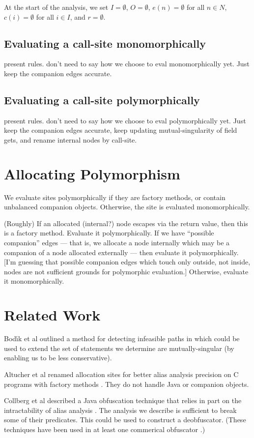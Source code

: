 \documentclass[11pt,notitlepage]{article}
\begin{document}
At the start of the analysis, we set $I=\emptyset$, $O=\emptyset$,
$e(n)=\emptyset$ for all $n\in N$, $c(i)=\emptyset$ for all $i\in I$,
and $r=\emptyset$.

\subsection{Evaluating a call-site monomorphically}

present rules.  don't need to say how we choose to eval
monomorphically yet.  Just keep the companion edges accurate.

\subsection{Evaluating a call-site polymorphically}

present rules.  don't need to say how we choose to eval
polymorphically yet.  Just keep the companion edges accurate,
keep updating mutual-singularity of field gets,
and rename internal nodes by call-site.

\section{Allocating Polymorphism}

We evaluate sites polymorphically if they are factory methods, or
contain unbalanced companion objects.  Otherwise, the site is
evaluated monomorphically.

(Roughly) If an allocated (internal?) node escapes via the return
value, then this is a factory method.  Evaluate it polymorphically.
If we have ``possible companion'' edges --- that is, we allocate
a node internally which may be a companion of a node allocated
externally --- then evaluate it polymorphically.  [I'm guessing
that possible companion edges which touch only outside, not inside,
nodes are not sufficient grounds for polymorphic evaluation.]
Otherwise, evaluate it monomorphically.

\section{Related Work}

Bod{\'\i}k et al outlined a method for detecting infeasible paths
in \cite{267921} which could be used to extend the set of statements
we determine are mutually-singular (by enabling us to be less conservative).

Altucher et al renamed allocation sites for better alias analysis
precision on C programs with factory methods \cite{199466}.  They
do not handle Java or companion objects.

Collberg et al described a Java obfuscation technique that relies in
part on the intractability of alias analysis \cite{268962}.  The
analysis we describe is sufficient to break some of their predicates.
This could be used to construct a deobfuscator.  (These techniques
have been used in at least one commerical obfuscator \cite{humper02}.)



\end{document}
